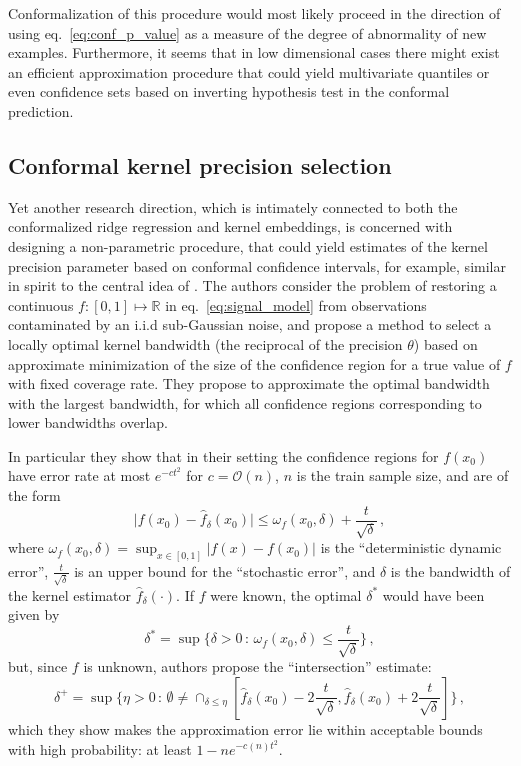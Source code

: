 \documentclass[a4paper,14pt]{extarticle}
\newcommand{\Real}{\mathbb{R}}
\begin{document}
Conformalization of this procedure would most likely proceed in the direction of
using eq.~\ref{eq:conf_p_value} as a measure of the degree of abnormality of new
examples. Furthermore, it seems that in low dimensional cases there might exist an
efficient approximation procedure that could yield multivariate quantiles or even
confidence sets based on inverting hypothesis test in the conformal prediction.


\subsection{Conformal kernel precision selection} %
\label{sub:conformal_kernel_precision_selection}

Yet another research direction, which is intimately connected to both the conformalized
ridge regression and kernel embeddings, is concerned with designing a non-parametric
procedure, that could yield estimates of the kernel precision parameter based on
conformal confidence intervals, for example, similar in spirit to the central idea
of \cite{goldenshluger1997}. The authors consider the problem of restoring a continuous
$f:[0,1] \mapsto\Real$ in eq.~\ref{eq:signal_model} from observations contaminated
by an i.i.d sub-Gaussian noise, and propose a method to select a locally optimal
kernel bandwidth (the reciprocal of the precision $\theta$) based on approximate
minimization of the size of the confidence region for a true value of $f$ with fixed
coverage rate. They propose to approximate the optimal bandwidth with the largest
bandwidth, for which all confidence regions corresponding to lower bandwidths overlap.

In particular they show that in their setting the confidence regions for $f(x_0)$
have error rate at most $e^{- c t^2}$ for $c = \mathcal{O}(n)$, $n$ is the train
sample size, and are of the form
\begin{equation*}
  \bigl| f(x_0) - \hat{f}_\delta(x_0) \bigr|
    \leq \omega_f(x_0, \delta) + \frac{t}{\sqrt{\delta}} \,,
\end{equation*}
where $\omega_f(x_0, \delta) = \sup_{x\in[0,1]} |f(x)-f(x_0)|$ is the ``deterministic
dynamic error'', $\frac{t}{\sqrt{\delta}}$ is an upper bound for the ``stochastic error'',
and $\delta$ is the bandwidth of the kernel estimator $\hat{f}_\delta(\cdot)$. If
$f$ were known, the optimal $\delta^*$ would have been given by
\begin{equation*}
  \delta^*
    = \sup\bigl\{ \delta > 0 \, : \,
        \omega_f(x_0, \delta) \leq \frac{t}{\sqrt{\delta}} \bigr\}\,,
\end{equation*}
but, since $f$ is unknown, authors propose the ``intersection'' estimate:
\begin{equation*}
  \delta^+
    = \sup\{ \eta > 0 \, : \, \emptyset \neq 
        \cap_{\delta\leq \eta} [\hat{f}_\delta(x_0) - 2 \frac{t}{\sqrt{\delta}},
                                \hat{f}_\delta(x_0) + 2 \frac{t}{\sqrt{\delta}}] \} \,,
\end{equation*}
which they show makes the approximation error lie within acceptable bounds with high
probability: at least $ 1 - n e^{-c(n) t^2}$.
\end{document}
